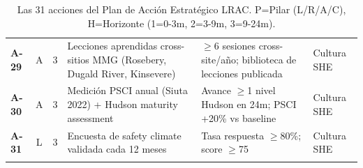\begin{longtable}{@{}>{\bfseries}p{0.55cm} c c >{\raggedright\arraybackslash}p{5.6cm} >{\raggedright\arraybackslash}p{4.8cm} >{\raggedright\arraybackslash}p{2.6cm}@{}}
A-29 & A & 3 & Lecciones aprendidas cross-sitios MMG (Rosebery, Dugald River, Kinsevere) & $\geq$6 sesiones cross-site/año; biblioteca de lecciones publicada & Cultura SHE \\
A-30 & A & 3 & Medición PSCI anual (Siuta 2022) + Hudson maturity assessment & Avance $\geq$1 nivel Hudson en 24m; PSCI +20\% vs baseline & Cultura SHE \\
A-31 & L & 3 & Encuesta de safety climate validada cada 12 meses & Tasa respuesta $\geq$80\%; score $\geq$75 & Cultura SHE \\
\bottomrule
\caption{Las 31 acciones del Plan de Acción Estratégico LRAC. P=Pilar (L/R/A/C), H=Horizonte (1=0-3m, 2=3-9m, 3=9-24m).}
\label{tab:acciones}
\end{longtable}
\endgroup